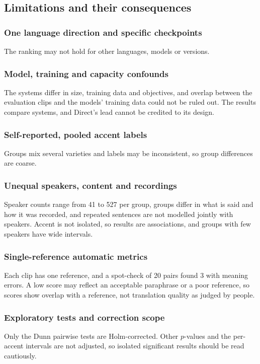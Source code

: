 \subsection{Limitations and their consequences}
\subsubsection{One language direction and specific checkpoints}
The ranking may not hold for other languages, models or versions.

\subsubsection{Model, training and capacity confounds}
The systems differ in size, training data and objectives, and overlap
between the evaluation clips and the models' training data could not
be ruled out. The results compare systems, and Direct's lead cannot
be credited to its design.

\subsubsection{Self-reported, pooled accent labels}
Groups mix several varieties and labels may be inconsistent, so group
differences are coarse.

\subsubsection{Unequal speakers, content and recordings}
Speaker counts range from 41 to 527 per group, groups differ in what
is said and how it was recorded, and repeated sentences are not
modelled jointly with speakers. Accent is not isolated, so results
are associations, and groups with few speakers have wide intervals.

\subsubsection{Single-reference automatic metrics}
Each clip has one reference, and a spot-check of 20 pairs found 3
with meaning errors. A low score may reflect an acceptable paraphrase
or a poor reference, so scores show overlap with a reference, not
translation quality as judged by people.

\subsubsection{Exploratory tests and correction scope}
Only the Dunn pairwise tests are Holm-corrected. Other $p$-values and
the per-accent intervals are not adjusted, so isolated significant
results should be read cautiously.

